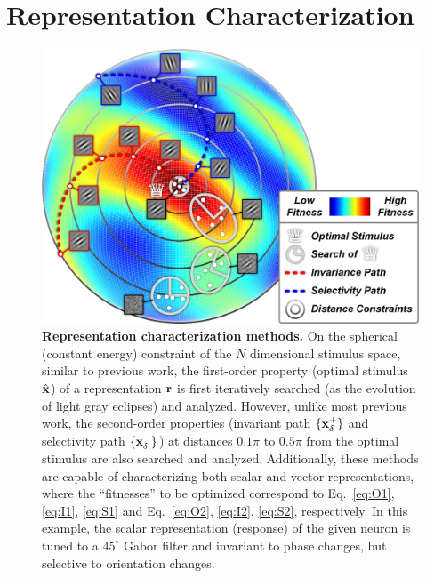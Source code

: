 \documentclass[10pt,twocolumn,letterpaper]{article}
\begin{document}
\section{Representation Characterization}

\begin{figure}
\begin{center}
\includegraphics[width=1.0\columnwidth]{Figs/methods.jpg} 
\end{center}
\caption{{\bf Representation characterization methods.}
On the spherical (\ie constant energy) constraint of the $N$ dimensional stimulus space, similar to previous work, the first-order property (\ie optimal stimulus $\hat{\bf{x}}$) of a representation $\bf{r}$ is first iteratively searched (as the evolution of light gray eclipses) and analyzed.
However, unlike most previous work, the second-order properties (\ie invariant path $\lbrace \bf{x}^{+}_{\delta} \rbrace$ and selectivity path $\lbrace \bf{x}^{-}_{\delta} \rbrace$) at distances $0.1\pi$ to $0.5\pi$ from the optimal stimulus are also searched and analyzed.
Additionally, these methods are capable of characterizing both scalar and vector representations, where the ``fitnesses'' to be optimized correspond to Eq.~\ref{eq:O1}, \ref{eq:I1}, \ref{eq:S1} and Eq.~\ref{eq:O2}, \ref{eq:I2}, \ref{eq:S2}, respectively.
In this example, the scalar representation (\ie response) of the given neuron is tuned to a $45^{\circ}$ Gabor filter and invariant to phase changes, but selective to orientation changes.
}
\label{fig:methods}
\end{figure}

\end{document}
